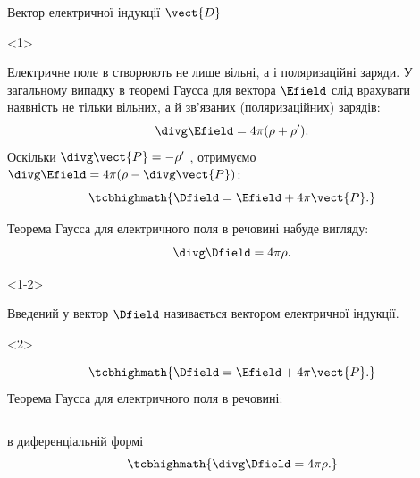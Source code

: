 \documentclass[onlytextwidth]{beamer}
\begin{document}
\begin{frame}{Вектор електричної індукції $\vect{D}$}{}
	\begin{onlyenv}
		\begin{block}{}\justifying
			Електричне поле в створюють не лише вільні, а і поляризаційні заряди. У загальному випадку в
			теоремі Гаусса для вектора $\Efield$ слід врахувати наявність не тільки вільних, а й
			зв'язаних (поляризаційних) зарядів:
			\begin{equation*}
				\divg\Efield = 4\pi(\rho + \rho').
			\end{equation*}
			Оскільки $\divg\vect{P} = - \rho'$ , отримуємо $\divg\Efield = 4\pi(\rho -\divg\vect{P})$:
			\begin{equation*}
				\tcbhighmath{
					\Dfield = \Efield + 4\pi\vect{P}.
				}
			\end{equation*}
		\end{block}
		\begin{block}{}
			Теорема Гаусса для електричного поля в речовині набуде вигляду:
			\begin{equation*}
				\divg\Dfield = 4\pi\rho.
			\end{equation*}
		\end{block}
	\end{onlyenv}
	\begin{onlyenv}<1-2>
		\begin{block}{}
			Введений у вектор $\Dfield$ називається \alert{вектором електричної індукції}.
		\end{block}
	\end{onlyenv}
	\begin{onlyenv}
		\begin{block}{}
			\begin{equation*}
				\tcbhighmath{
					\Dfield = \Efield + 4\pi\vect{P}.
				}
			\end{equation*}
			Теорема Гаусса для електричного поля в речовині:
		\end{block}
		\begin{columns}
			\begin{column}{0.5\linewidth}
				\begin{block}{}\centering
					в диференціальній формі
					\begin{equation*}
						\tcbhighmath{\divg\Dfield = 4\pi\rho.}
					\end{equation*}
				\end{block}
			\end{column}

\end{columns}
\end{onlyenv}
\end{frame}
\end{document}
